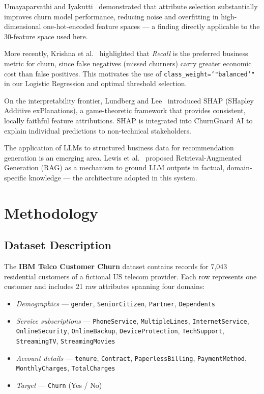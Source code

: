 \documentclass[conference]{IEEEtran}
\begin{document}
Umayaparvathi and Iyakutti~\cite{umayaparvathi2016attribute} demonstrated
that attribute selection substantially improves churn model performance,
reducing noise and overfitting in high-dimensional one-hot-encoded feature
spaces — a finding directly applicable to the 30-feature space used here.

More recently, Krishna et al.~\cite{kirui2013predicting} highlighted that
\textit{Recall} is the preferred business metric for churn, since false
negatives (missed churners) carry greater economic cost than false
positives. This motivates the use of \texttt{class\_weight=\char`"balanced\char`"}
in our Logistic Regression and optimal threshold selection.

On the interpretability frontier, Lundberg and Lee~\cite{lundberg2017shap}
introduced SHAP (SHapley Additive exPlanations), a game-theoretic
framework that provides consistent, locally faithful feature attributions.
SHAP is integrated into ChurnGuard AI to explain individual predictions
to non-technical stakeholders.

The application of LLMs to structured business data for recommendation
generation is an emerging area. Lewis et al.~\cite{lewis2020rag} proposed
Retrieval-Augmented Generation (RAG) as a mechanism to ground LLM outputs
in factual, domain-specific knowledge — the architecture adopted in
this system.

\section{Methodology}

\subsection{Dataset Description}

The \textbf{IBM Telco Customer Churn} dataset \cite{kaggle_telco} contains
records for 7,043 residential customers of a fictional US telecom provider.
Each row represents one customer and includes 21 raw attributes spanning
four domains:

\begin{itemize}
  \item \textit{Demographics} — \texttt{gender}, \texttt{SeniorCitizen},
        \texttt{Partner}, \texttt{Dependents}
  \item \textit{Service subscriptions} — \texttt{PhoneService},
        \texttt{MultipleLines}, \texttt{InternetService},
        \texttt{OnlineSecurity}, \texttt{OnlineBackup},
        \texttt{DeviceProtection}, \texttt{TechSupport},
        \texttt{StreamingTV}, \texttt{StreamingMovies}
  \item \textit{Account details} — \texttt{tenure}, \texttt{Contract},
        \texttt{PaperlessBilling}, \texttt{PaymentMethod},
        \texttt{MonthlyCharges}, \texttt{TotalCharges}
  \item \textit{Target} — \texttt{Churn} (Yes / No)
\end{itemize}
\end{document}
